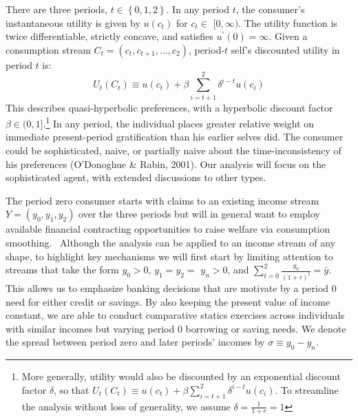 \documentclass[11pt]{article}%
\begin{document}
There are three periods, $t\in\left\{  0,1,2\right\}  $. In any period $t$,
the consumer's instantaneous utility is given by $u\left(  c_{t}\right)  $ for
$c_{t}\in$ $[0,\infty)$. The utility function is twice differentiable,
strictly concave, and satisfies $u^{\prime}\left(  0\right)  =\infty$. Given a
consumption stream $C_{t}=\left(  c_{t},c_{t+1},...,c_{2}\right)  $,
period-$t$ self's discounted utility in period $t$ is:%
\[
U_{t}\left(  C_{t}\right)  \equiv u\left(  c_{t}\right)  +\beta\sum
\limits_{i=t+1}^{2}\delta^{i-t}u\left(  c_{i}\right)
\]
This describes quasi-hyperbolic preferences, with a hyperbolic discount factor
$\beta\in(0,1]$.\footnote{More generally, utility would also be discounted by
an exponential discount factor $\delta$, so that $U_{t}\left(  C_{t}\right)
\equiv u\left(  c_{t}\right)  +\beta\sum\limits_{i=t+1}^{2}\delta
^{i-t}u\left(  c_{i}\right)  $. To streamline the analysis without loss of
generality, we assume $\delta=\frac{1}{1+r}=1$} In any period, the individual
places greater relative weight on immediate present-period gratification than
his earlier selves did. The consumer could be sophisticated, naive, or
partially naive about the time-inconsistency of his preferences (O'Donoghue \&
Rabin, 2001). Our analysis will focus on the sophisticated agent, with
extended discussions to other types.

The period zero consumer starts with claims to an existing income stream
$Y=\left(  y_{0},y_{1},y_{2}\right)  $ over the three periods but will in
general want to employ available financial contracting opportunities to raise
welfare via consumption smoothing. \ Although the analysis can be applied to
an income stream of any shape, to highlight key mechanisms we will first start
by limiting attention to streams that take the form $y_{0}>0 $, $y_{1}=y_{2}=$
$y_{n}>0$, and $\sum_{t=0}^{2}\frac{y_{0}}{(1+r)^{t}}=\bar{y}$. This allows us
to emphasize banking decisions that are motivate by a period 0 need for either
credit or savings. By also keeping the present value of income constant, we
are able to conduct comparative statics exercises across individuals with
similar incomes but varying period 0 borrowing or saving needs. We denote the
spread between period zero and later periods' incomes by $\sigma\equiv
y_{0}-y_{n}$.
\end{document}
